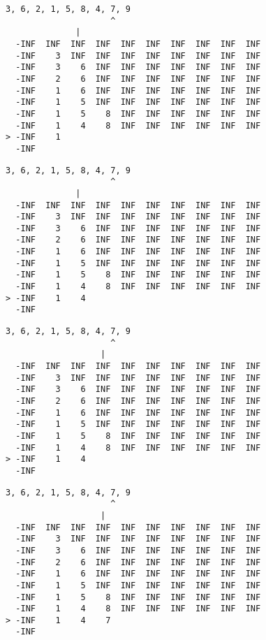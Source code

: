 { \begin{verbatim}
3, 6, 2, 1, 5, 8, 4, 7, 9
                     ^
              |
  -INF  INF  INF  INF  INF  INF  INF  INF  INF  INF
  -INF    3  INF  INF  INF  INF  INF  INF  INF  INF
  -INF    3    6  INF  INF  INF  INF  INF  INF  INF
  -INF    2    6  INF  INF  INF  INF  INF  INF  INF
  -INF    1    6  INF  INF  INF  INF  INF  INF  INF
  -INF    1    5  INF  INF  INF  INF  INF  INF  INF
  -INF    1    5    8  INF  INF  INF  INF  INF  INF
  -INF    1    4    8  INF  INF  INF  INF  INF  INF
> -INF    1                                        
  -INF                                             
\end{verbatim} }

{ \begin{verbatim}
3, 6, 2, 1, 5, 8, 4, 7, 9
                     ^
              |
  -INF  INF  INF  INF  INF  INF  INF  INF  INF  INF
  -INF    3  INF  INF  INF  INF  INF  INF  INF  INF
  -INF    3    6  INF  INF  INF  INF  INF  INF  INF
  -INF    2    6  INF  INF  INF  INF  INF  INF  INF
  -INF    1    6  INF  INF  INF  INF  INF  INF  INF
  -INF    1    5  INF  INF  INF  INF  INF  INF  INF
  -INF    1    5    8  INF  INF  INF  INF  INF  INF
  -INF    1    4    8  INF  INF  INF  INF  INF  INF
> -INF    1    4                                   
  -INF                                             
\end{verbatim} }

{ \begin{verbatim}
3, 6, 2, 1, 5, 8, 4, 7, 9
                     ^
                   |
  -INF  INF  INF  INF  INF  INF  INF  INF  INF  INF
  -INF    3  INF  INF  INF  INF  INF  INF  INF  INF
  -INF    3    6  INF  INF  INF  INF  INF  INF  INF
  -INF    2    6  INF  INF  INF  INF  INF  INF  INF
  -INF    1    6  INF  INF  INF  INF  INF  INF  INF
  -INF    1    5  INF  INF  INF  INF  INF  INF  INF
  -INF    1    5    8  INF  INF  INF  INF  INF  INF
  -INF    1    4    8  INF  INF  INF  INF  INF  INF
> -INF    1    4                                   
  -INF                                             
\end{verbatim} }

{ \begin{verbatim}
3, 6, 2, 1, 5, 8, 4, 7, 9
                     ^
                   |
  -INF  INF  INF  INF  INF  INF  INF  INF  INF  INF
  -INF    3  INF  INF  INF  INF  INF  INF  INF  INF
  -INF    3    6  INF  INF  INF  INF  INF  INF  INF
  -INF    2    6  INF  INF  INF  INF  INF  INF  INF
  -INF    1    6  INF  INF  INF  INF  INF  INF  INF
  -INF    1    5  INF  INF  INF  INF  INF  INF  INF
  -INF    1    5    8  INF  INF  INF  INF  INF  INF
  -INF    1    4    8  INF  INF  INF  INF  INF  INF
> -INF    1    4    7                              
  -INF                                             
\end{verbatim} }

